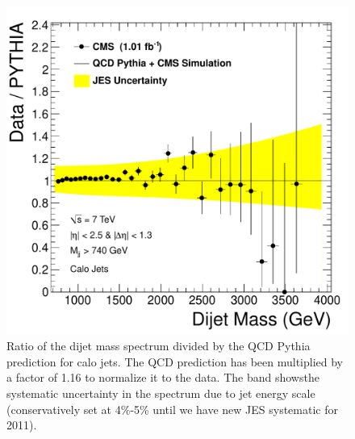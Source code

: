 \begin{figure}[!ht]
  \begin{center}
   \includegraphics[width=\textwidth]{Figures/data_over_pythia_calo.pdf}
    \caption{ Ratio of the dijet mass spectrum divided by the QCD Pythia prediction for calo jets. The
    QCD prediction has been multiplied by a factor of 1.16 to normalize it to the data.
    The band showsthe systematic uncertainty in the spectrum due to jet energy
    scale (conservatively set at 4\%-5\% until we have new JES systematic for 2011). }
    \label{DataOverPythia_calo}
  \end{center}
\end{figure}



